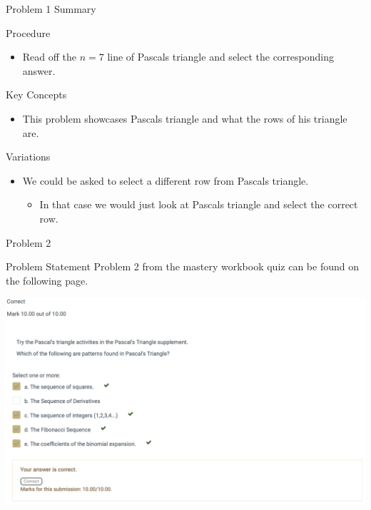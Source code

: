 \begin{summary}{Problem 1 Summary}
    \begin{statement}{Procedure}
        \begin{itemize}
            \item Read off the $n = 7$ line of Pascals triangle and select the corresponding answer.
        \end{itemize}
    \end{statement}
    \begin{statement}{Key Concepts}
        \begin{itemize}
            \item This problem showcases Pascals triangle and what the rows of his triangle are.
        \end{itemize}
    \end{statement}
    \begin{statement}{Variations}
        \begin{itemize}
            \item We could be asked to select a different row from Pascals triangle.
            \begin{itemize}
                \item In that case we would just look at Pascals triangle and select the correct row.
            \end{itemize}
        \end{itemize}
    \end{statement}
\end{summary}

\begin{problem}{Problem 2}
    \begin{statement}{Problem Statement}
        Problem 2 from the mastery workbook quiz can be found on the following page.
    \end{statement}
    \begin{Highlight}[Solution]
        \begin{center}
            \includegraphics[width = 1.0\textwidth]{Images/Problem 2.png}
        \end{center}
    \end{Highlight}
\end{problem}

